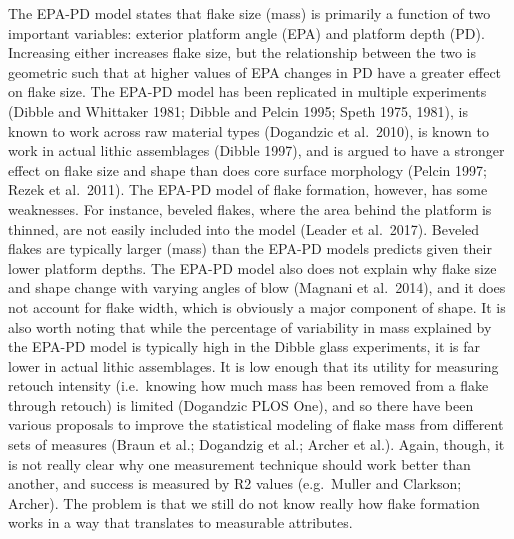 \documentclass[10pt,letterpaper]{article}
\begin{document}
The EPA-PD model states that flake size (mass) is primarily a function
of two important variables: exterior platform angle (EPA) and platform
depth (PD). Increasing either increases flake size, but the relationship
between the two is geometric such that at higher values of EPA changes
in PD have a greater effect on flake size. The EPA-PD model has been
replicated in multiple experiments (Dibble and Whittaker 1981; Dibble
and Pelcin 1995; Speth 1975, 1981), is known to work across raw material
types (Dogandzic et al.~2010), is known to work in actual lithic
assemblages (Dibble 1997), and is argued to have a stronger effect on
flake size and shape than does core surface morphology (Pelcin 1997;
Rezek et al.~2011). The EPA-PD model of flake formation, however, has
some weaknesses. For instance, beveled flakes, where the area behind the
platform is thinned, are not easily included into the model (Leader et
al.~2017). Beveled flakes are typically larger (mass) than the EPA-PD
models predicts given their lower platform depths. The EPA-PD model also
does not explain why flake size and shape change with varying angles of
blow (Magnani et al.~2014), and it does not account for flake width,
which is obviously a major component of shape. It is also worth noting
that while the percentage of variability in mass explained by the EPA-PD
model is typically high in the Dibble glass experiments, it is far lower
in actual lithic assemblages. It is low enough that its utility for
measuring retouch intensity (i.e.~knowing how much mass has been removed
from a flake through retouch) is limited (Dogandzic PLOS One), and so
there have been various proposals to improve the statistical modeling of
flake mass from different sets of measures (Braun et al.; Dogandzig et
al.; Archer et al.). Again, though, it is not really clear why one
measurement technique should work better than another, and success is
measured by R2 values (e.g.~Muller and Clarkson; Archer). The problem is
that we still do not know really how flake formation works in a way that
translates to measurable attributes.
\end{document}
